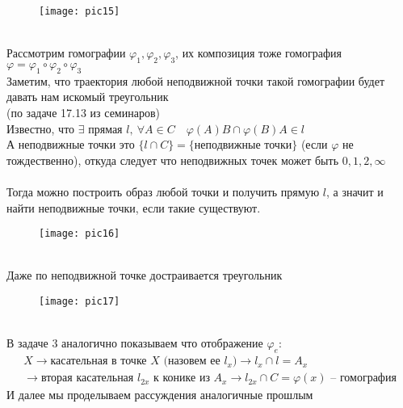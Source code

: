 \begin{figure}[h!]
	\texttt{[image: pic15]}
\end{figure}\\
Рассмотрим гомографии $\varphi_{1}, \varphi_{2}, \varphi_{3}$, их композиция тоже гомография $\varphi = \varphi_{1} \circ \varphi_{2} \circ \varphi_{3}$\\
Заметим, что траектория любой неподвижной точки такой гомографии будет давать нам искомый треугольник\\
\vskip 0.2in
\noindent
(по задаче 17.13 из семинаров)\\
Известно, что $\exists \text{ прямая }l,\ \forall A \in C\quad \varphi(A)B \cap \varphi(B)A \in l$\\
А неподвижные точки это $\{l \cap C\} = \{\text{неподвижные точки}\}$ (если $\varphi$ не тождественно), откуда следует что неподвижных точек может быть $0,1,2,\infty$\\
\\
Тогда можно построить образ любой точки и получить прямую $l$, а значит и найти неподвижные точки, если такие существуют.\\
\begin{figure}[!h]
	\texttt{[image: pic16]}
\end{figure}\\
Даже по неподвижной точке достраивается треугольник
\begin{figure}[!h]
	\texttt{[image: pic17]}
\end{figure}\\
В задаче 3 аналогично показываем что отображение $\varphi_e$:
\begin{gather*}
	X \to \text{касательная в точке $X$ (назовем ее $l_x$)} \to l_x \cap l = A_x\\
	\to \text{вторая касательная $l_{2x}$ к конике из $A_x$} \to l_{2x}\cap C = \varphi(x) \text{ -- гомография}
\end{gather*}
И далее мы проделываем рассуждения аналогичные прошлым